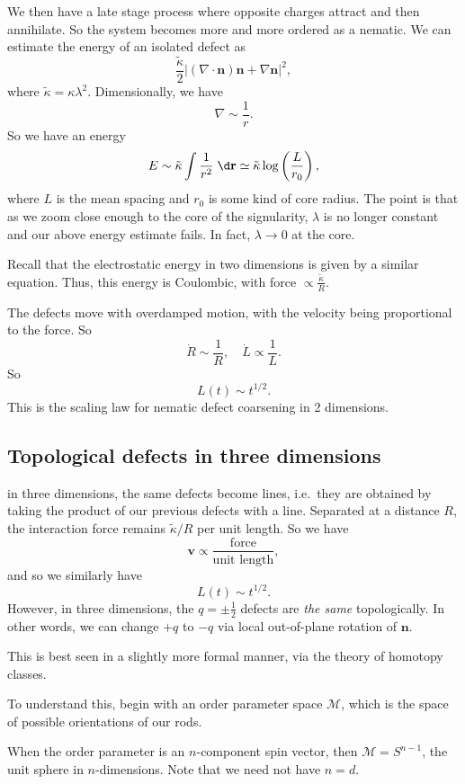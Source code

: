 \documentclass[a4paper]{article}
\begin{document}
We then have a late stage process where opposite charges attract and then annihilate. So the system becomes more and more ordered as a nematic. We can estimate the energy of an isolated defect as
\[
  \frac{\tilde{\kappa}}{2} |(\nabla \cdot \mathbf{n}) \mathbf{n} + \nabla \mathbf{n}|^2,
\]
where $\tilde{\kappa} = \kappa \lambda^2$. Dimensionally, we have
\[
  \nabla \sim \frac{1}{r}.
\]
So we have an energy
\[
  E \sim \tilde{\kappa} \int \frac{1}{r^2} \;\d \mathbf{r} \simeq \tilde{\kappa} \log \left(\frac{L}{r_0}\right),
\]
where $L$ is the mean spacing and $r_0$ is some kind of core radius. The point is that as we zoom close enough to the core of the signularity, $\lambda$ is no longer constant and our above energy estimate fails. In fact, $\lambda \to 0$ at the core.

Recall that the electrostatic energy in two dimensions is given by a similar equation. Thus, this energy is Coulombic, with force $\propto \frac{\tilde{\kappa}}{R}$.

The defects move with overdamped motion, with the velocity being proportional to the force. So
\[
  \dot{R} \sim  \frac{1}{R},\quad \dot{L} \propto \frac{1}{L}.
\]
So
\[
  L(t) \sim t^{1/2}.
\]
This is the scaling law for nematic defect coarsening in 2 dimensions.

\subsection{Topological defects in three dimensions}
in three dimensions, the same defects become lines, i.e.\ they are obtained by taking the product of our previous defects with a line. Separated at a distance $R$, the interaction force remains $\tilde{\kappa}/R$ per unit length. So we have
\[
  \mathbf{v} \propto \frac{\text{force}}{\text{unit length}},
\]
and so we similarly have
\[
  L(t) \sim t^{1/2}.
\]
However, in three dimensions, the $q = \pm \frac{1}{2}$ defects are \emph{the same} topologically. In other words, we can change $+q$ to $-q$ via local out-of-plane rotation of $\mathbf{n}$.

This is best seen in a slightly more formal manner, via the theory of homotopy classes.

To understand this, begin with an order parameter space $\mathcal{M}$, which is the space of possible orientations of our rods.
\begin{eg}
  When the order parameter is an $n$-component spin vector, then $\mathcal{M} = S^{n - 1}$, the unit sphere in $n$-dimensions. Note that we need not have $n = d$.
\end{eg}
\end{document}
